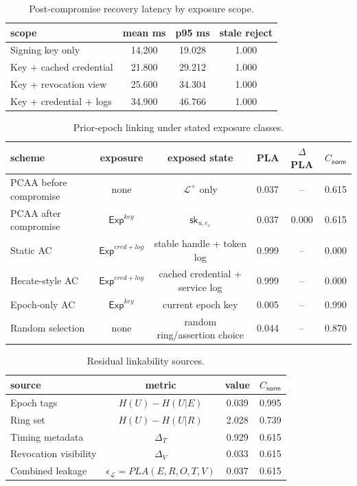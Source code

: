 \begin{table}[htbp]
\centering
\caption{Post-compromise recovery latency by exposure scope.}
\label{tab:recovery}
\begin{tabular}{@{}lccc@{}}
\toprule
scope & mean ms & p95 ms & stale reject \\
\midrule
Signing key only & 14.200 & 19.028 & 1.000 \\
Key + cached credential & 21.800 & 29.212 & 1.000 \\
Key + revocation view & 25.600 & 34.304 & 1.000 \\
Key + credential + logs & 34.900 & 46.766 & 1.000 \\
\bottomrule
\end{tabular}
\end{table}


\begin{table}[htbp]
\centering
\caption{Prior-epoch linking under stated exposure classes.}
\label{tab:unlinkability-current-key}
\begin{tabular}{@{}lccccc@{}}
\toprule
scheme & exposure & exposed state & PLA & $\Delta$PLA & $C_{\mathsf{norm}}$ \\
\midrule
PCAA before compromise & none & $\mathcal{L}^{+}$ only & 0.037 & -- & 0.615 \\
PCAA after compromise & $\mathsf{Exp}^{key}$ & $\mathsf{sk}_{u,e_c}$ & 0.037 & 0.000 & 0.615 \\
Static AC & $\mathsf{Exp}^{cred+log}$ & stable handle + token log & 0.999 & -- & 0.000 \\
Hecate-style AC & $\mathsf{Exp}^{cred+log}$ & cached credential + service log & 0.999 & -- & 0.000 \\
Epoch-only AC & $\mathsf{Exp}^{key}$ & current epoch key & 0.005 & -- & 0.990 \\
Random selection & none & random ring/assertion choice & 0.044 & -- & 0.870 \\
\bottomrule
\end{tabular}
\end{table}


\begin{table}[htbp]
\centering
\caption{Residual linkability sources.}
\label{tab:residual-sources}
\begin{tabular}{@{}lccc@{}}
\toprule
source & metric & value & $C_{\mathsf{norm}}$ \\
\midrule
Epoch tags & $H(U)-H(U|E)$ & 0.039 & 0.995 \\
Ring set & $H(U)-H(U|R)$ & 2.028 & 0.739 \\
Timing metadata & $\Delta_T$ & 0.929 & 0.615 \\
Revocation visibility & $\Delta_V$ & 0.033 & 0.615 \\
Combined leakage & $\epsilon_{\mathcal{L}}=PLA(E,R,O,T,V)$ & 0.037 & 0.615 \\
\bottomrule
\end{tabular}
\end{table}


